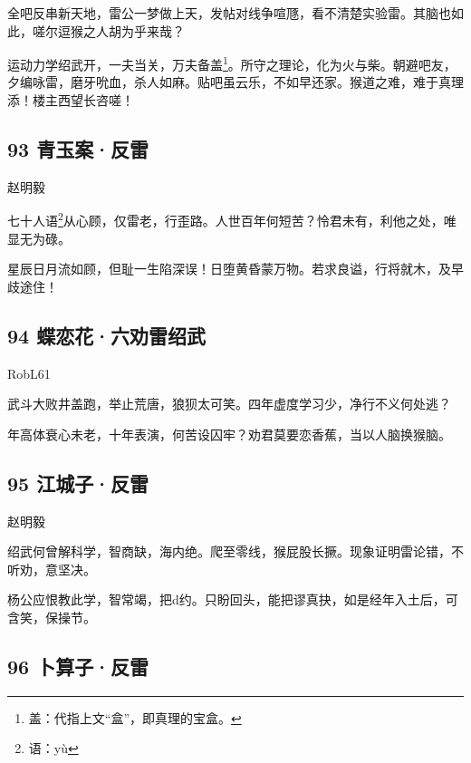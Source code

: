 全吧反串新天地，雷公一梦做上天，发帖对线争喧豗，看不清楚实验雷。其脑也如此，嗟尔逗猴之人胡为乎来哉？

运动力学绍武开，一夫当关，万夫备盖\footnote{盖：代指上文``盒''，即真理的宝盒。}。所守之理论，化为火与柴。朝避吧友，夕编咏雷，磨牙吮血，杀人如麻。贴吧虽云乐，不如早还家。猴道之难，难于真理添！楼主西望长咨嗟！

\hypertarget{ux9752ux7389ux6848ux53cdux96f7}{%
\subsection{93 青玉案·反雷}\label{ux9752ux7389ux6848ux53cdux96f7}}

{赵明毅}

七十人语\footnote{语：yù}从心顾，仅雷老，行歪路。人世百年何短苦？怜君未有，利他之处，唯显无为碌。

星辰日月流如顾，但耻一生陷深误！日堕黄昏蒙万物。若求良谥，行将就木，及早歧途住！

\hypertarget{ux8776ux604bux82b1ux516dux529dux96f7ux7ecdux6b66}{%
\subsection{94
蝶恋花·六劝雷绍武}\label{ux8776ux604bux82b1ux516dux529dux96f7ux7ecdux6b66}}

{RobL61}

武斗大败井盖跑，举止荒唐，狼狈太可笑。四年虚度学习少，净行不义何处逃？

年高体衰心未老，十年表演，何苦设囚牢？劝君莫要恋香蕉，当以人脑换猴脑。

\hypertarget{ux6c5fux57ceux5b50ux53cdux96f7}{%
\subsection{\texorpdfstring{95 江城子·反雷
}{95 江城子·反雷 }}\label{ux6c5fux57ceux5b50ux53cdux96f7}}

{赵明毅}

绍武何曾解科学，智商缺，海内绝。爬至零线，猴屁股长撅。现象证明雷论错，不听劝，意坚决。

杨公应恨教此学，智常竭，把d约。只盼回头，能把谬真抉，如是经年入土后，可含笑，保操节。

\hypertarget{ux535cux7b97ux5b50ux53cdux96f7}{%
\subsection{96 卜算子·反雷}\label{ux535cux7b97ux5b50ux53cdux96f7}}

